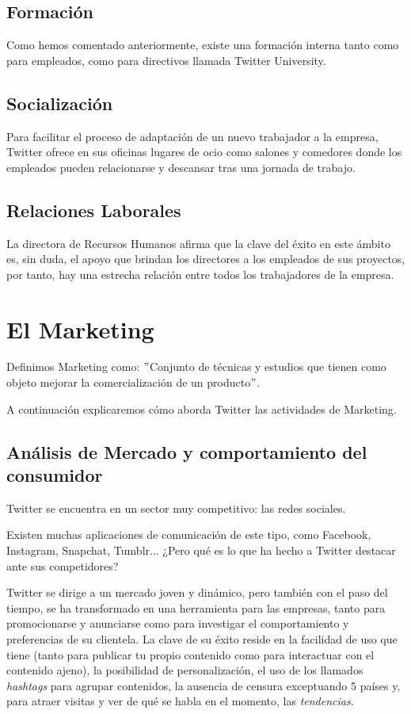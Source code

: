 \subsection{Formación}

Como hemos comentado anteriormente, existe una formación interna tanto como para empleados, como para directivos llamada Twitter University.

\subsection{Socialización}

Para facilitar el proceso de adaptación de un nuevo trabajador a la empresa, Twitter ofrece en sus oficinas lugares de ocio como salones y comedores donde los empleados pueden relacionarse y descansar tras una jornada de trabajo.

\subsection{Relaciones Laborales}

La directora de Recursos Humanos afirma que la clave del éxito en este ámbito es, sin duda, el apoyo que brindan los directores a los empleados de sus proyectos, por tanto, hay una estrecha relación entre todos los trabajadores de la empresa.

\section{El Marketing}

Definimos Marketing como: $"$Conjunto de técnicas y estudios que tienen como objeto mejorar la comercialización de un producto$"$.

A continuación explicaremos cómo aborda Twitter las actividades de Marketing.

\subsection{Análisis de Mercado y comportamiento del consumidor}

Twitter se encuentra en un sector muy competitivo: las redes sociales.

Existen muchas aplicaciones de comunicación de este tipo, como Facebook, Instagram, Snapchat, Tumblr... ¿Pero qué es lo que ha hecho a Twitter destacar ante sus competidores?

Twitter se dirige a un mercado joven y dinámico, pero también con el paso del tiempo, se ha transformado en una herramienta para las empresas, tanto para promocionarse y anunciarse como para investigar el comportamiento y preferencias de su clientela.
La clave de su éxito reside en la facilidad de uso que tiene (tanto para publicar tu propio contenido como para interactuar con el contenido ajeno), la posibilidad de personalización, el uso de los llamados \textit{hashtags} para agrupar contenidos, la ausencia de censura exceptuando 5 países y, para atraer visitas y ver de qué se habla en el momento, las \textit{tendencias}.

